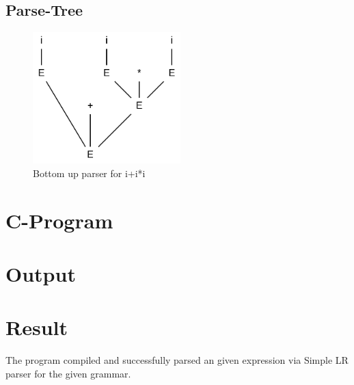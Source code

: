 \subsection{Parse-Tree}
\begin{figure}[!h]
	\centering
	\includegraphics[height=2in]{../EXP7/parse_tree.png}
	\caption{Bottom up parser for i+i*i}
\end{figure}

\break
\section{C-Program}


\section{Output}


\section{Result}
The program compiled and successfully parsed an given expression via Simple LR parser for the given grammar.